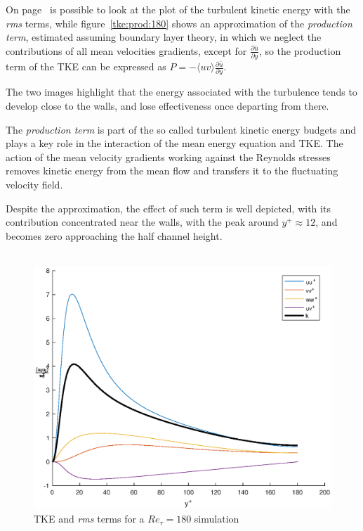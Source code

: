 On page~\pageref{k+budgets:180} is possible to look at the plot of the turbulent kinetic energy with the \emph{rms} terms, while figure~\ref{tke:prod:180} shows an approximation of the \emph{production term}, estimated assuming boundary layer theory, in which we neglect the contributions of all mean velocities gradients, except for $\frac{\partial{\bar{u}}}{\partial{y}}$, so the production term of the TKE can be expressed as $P=-\langle uv\rangle \frac{\partial{\bar{u}}}{\partial{y}}$.\par
The two images highlight that the energy associated with the turbulence tends to develop close to the walls, and lose effectiveness once departing from there.\par
The \emph{production term} is part of the so called turbulent kinetic energy budgets and plays a key role in the interaction of the mean energy equation and TKE. The action of the mean velocity gradients working against the Reynolds stresses removes kinetic energy from the mean flow and transfers it to the fluctuating velocity field. \par
Despite the approximation, the effect of such term is well depicted, with its contribution concentrated near the walls, with the peak around $y^{+} \approx 12$, and becomes zero approaching the half channel height. \\~\par

\begin{figure}
\begin{center}
\includegraphics[scale=0.55]{grafici/budget+k_180.eps}
\caption{TKE and \emph{rms} terms for a $Re_{\tau}=180$ simulation}
\label{k+budgets:180}
\end{center} 
\end{figure}


